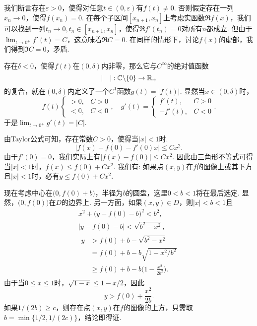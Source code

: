 \begin{ans}
  我们断言存在$\varepsilon>0$，使得对任意$t\in(0,\varepsilon)$有$f(t)\ne0$. 否则假定存在一列$x_n\to0$，使得$f(x_n)=0$. 在每个子区间$[x_{n+1},x_n]$上考虑实函数$\Re f(x)$，我们可以找到一列$t_n\to0,t_n\in[x_{n+1},x_n]$，使得$\Re f'(t_n)=0$对所有$n$都成立. 但由于$\lim_{t\to0^+}f'(t)=C$，这意味着$\Re C=0$. 在同样的情形下，讨论$f(x)$的虚部，我们得到$\Im C=0$，矛盾.

  存在$\delta<0$，使得$f(t)$在$(0,\delta)$内非零，那么它与$C^\infty$的绝对值函数
  \[ |\quad|:\mathbb C\backslash\{0\}\to\mathbb R_+ \]
  的复合，就在$(0,\delta)$内定义了一个$C^1$函数$g(t)=|f(t)|$. 显然当$x\in(0,\delta)$时，
  \[
    f(t) \begin{cases}
      >0, & C>0\\
      <0, & C<0
    \end{cases},\quad g'(t)=\begin{cases}
      f'(t), & C>0\\
      -f'(t), & C<0
    \end{cases}.
  \]
  于是$\lim_{t\to0^+}g'(t)=|C|$.
\end{ans}

\begin{ans}
  由Taylor公式可知，存在常数$C>0$，使得当$|x|<1$时.
  \[
    |f(x)-f(0)-f'(0)x|\le Cx^2.
  \]
  由于$f'(0)=0$，我们实际上有$|f(x)-f(0)|\le Cx^2$. 因此由三角形不等式可得当$|x|<1$时，$f(x)\le f(0)+Cx^2$. 我们有: 如果点$(x,y)$在$f$的图像上或其下方且$|x|<1$时，必有$y\le f(0)+Cx^2$.

  现在考虑中心在$\big(0,f(0)+b\big)$，半径为$b$的圆盘，这里$0<b<1$将在最后选定. 显然，$\big(0,f(0)\big)$在$D$的边界上. 另一方面，如果$(x,y)\in D$，则$|x|<b<1$且
  \begin{gather*}
    x^2+\big(y-f(0)-b\big)^2 < b^2,\\
    |y-f(0)-b|<\sqrt{b^2-x^2},\\
    \begin{aligned}
      y & > f(0)+b-\sqrt{b^2-x^2} \\
        & = f(0)+b-b\sqrt{1-x^2/b^2} \\
        & \ge f(0) + b -b\Big( 1-\frac{x^2}{2b^2} \Big).
    \end{aligned}
  \end{gather*}
  由于当$0\le x\le1$时，$\sqrt{1-x}\le 1-x/2$，因此
  \[ y>f(0)+\frac{x^2}{2b}. \]
  如果$1/(2b)\ge c$，则存在点$(x,y)$在$f$的图像的上方，只需取$b=\min\{1/2,1/(2c)\}$，结论即得证.
\end{ans}

